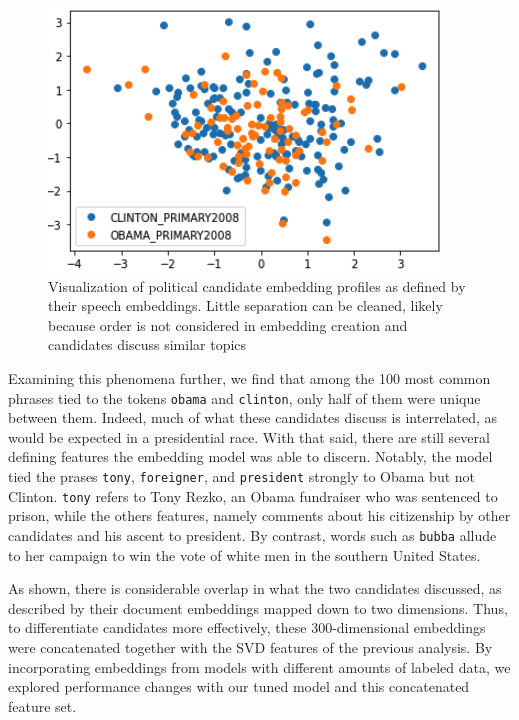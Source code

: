 \documentclass[11pt,a4paper]{article}
\begin{document}
\begin{figure}[htpb]
  \centering
  \includegraphics[width=1\linewidth]{imgs/PCA_w2v_Obama.png}
  \caption{Visualization of political candidate embedding profiles
  as defined by their speech embeddings. Little separation can be cleaned,
likely because order is not considered in embedding creation and candidates discuss similar topics}%
  \label{fig:imgs/PCA_w2v_Obama}
\end{figure}

Examining this phenomena further, we find that among the 100 most common phrases tied to the tokens \texttt{obama} and \texttt{clinton}, only half of them were unique between them. Indeed, much of what these candidates discuss is interrelated, as would be expected in a presidential race. With that said, there are still several defining features the embedding model was able to discern. Notably, the model tied the prases \texttt{tony}, \texttt{foreigner}, and \texttt{president} strongly to Obama but not Clinton. \texttt{tony} refers to Tony Rezko, an Obama fundraiser who was sentenced to prison, while the others features, namely comments about his citizenship by other candidates and his ascent to president. By contrast, words such as \texttt{bubba} allude to her campaign to win the vote of white men in the southern United States.

As shown, there is considerable overlap in what the two candidates discussed, as described by their document embeddings mapped down to two dimensions. Thus, to differentiate candidates more effectively, these 300-dimensional embeddings were concatenated together with the SVD features of the previous analysis. By incorporating embeddings from models with different amounts of labeled data, we explored performance changes with our tuned model and this concatenated feature set. 
\end{document}
